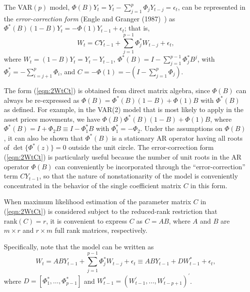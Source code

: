 The VAR$(p)$ model, $\Phi(B) Y_t = Y_t - \sum_{j=1}^p \Phi_j Y_{t-j} = \epsilon_t$, can be represented in the  \textit{error-correction form} (Engle and Granger (1987)~\cite{engle1987co}) as $\Phi^* (B) (1\!-\!B) Y_t = - \Phi (1) Y_{t-1} + \epsilon_t$; that is,
	\begin{equation}\label{eqn:2WtCt}
	W_t = C Y_{t-1} + \sum_{j=1}^{p-1} \Phi_j^* W_{t-j} + \epsilon_t ,
	\end{equation}
where $W_t = (1\!-\!B) Y_t = Y_t - Y_{t-1}$, $\Phi^* (B) = I - \sum_{j=1}^{p-1} \Phi_j^* B^j $, with $\Phi_j^* = - \sum_{i=j+1}^p \Phi_i$, and $C = - \Phi (1) = - (I - \sum_{j=1}^p \Phi_j)$.

The form (\ref{eqn:2WtCt}) is obtained from direct matrix algebra, since $\Phi (B)$ can always be re-expressed as $\Phi (B) = \Phi^* (B) (1-B) + \Phi (1) B$ with $\Phi^* (B)$ as defined.  For example, in the VAR(2) model that is most likely to apply  in the asset prices movements, we have $\Phi (B) \Phi^* (B) (1 - B) + \Phi (1) B$, where $\Phi^* (B) = I + \Phi_2 B \equiv I - \Phi_1^* B$ with $\Phi_1^* = - \Phi_2 $.  Under the assumptions on $\Phi (B)$, it can also be shown that $\Phi^* (B)$ is a stationary AR operator having all roots of $\det \{ \Phi^* (z) \} = 0$ outside the unit circle. The error-correction form (\ref{eqn:2WtCt}) is particularly useful because the number of unit roots in the AR operator $\Phi (B)$ can conveniently be incorporated through the ``error-correction'' term $C Y_{t-1}$, so that the nature of nonstationarity of the model is conveniently concentrated in the behavior of the single coefficient matrix $C$ in this form.


When maximum likelihood estimation of the parameter matrix $C$ in (\ref{eqn:2WtCt}) is
considered subject to the reduced-rank restriction that $\mbox{rank}(C)= r$, it is convenient to express $C$ as $C = A B $, where $A$ and $B$ are $m \times r$ and $r \times m$ full rank matrices,
respectively. 


Specifically, note that the model can be written as
	\begin{equation}\label{eqn:2WtABY}
	W_t = A B Y_{t-1} + \sum_{j=1}^{p-1} \Phi_j^* W_{t-j} + \epsilon_t \equiv
A B Y_{t-1} + D W_{t-1}^* + \epsilon_t , 
	\end{equation}
where $D = [\Phi_1^* ,\ldots,\Phi_{p-1}^* ]$ and $W_{t-1}^* = (W_{t-1}^{\prime}, \ldots, W_{t-p+1}^{\prime} )^{\prime}$.


